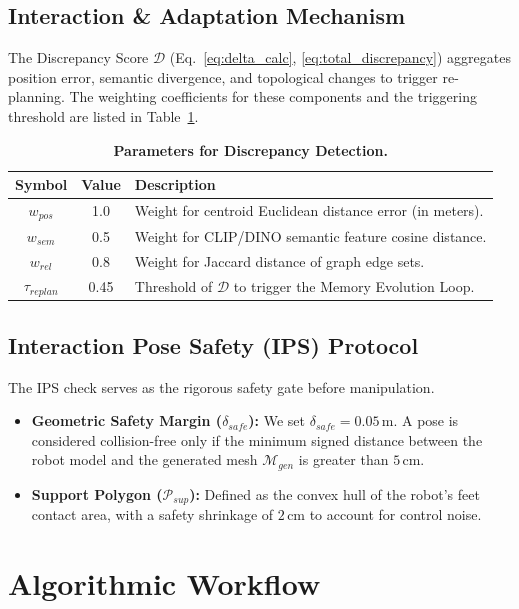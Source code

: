 \documentclass[conference]{IEEEtran}
\begin{document}
\subsection{Interaction \& Adaptation Mechanism}
The Discrepancy Score $\mathcal{D}$ (Eq.~\ref{eq:delta_calc}, \ref{eq:total_discrepancy}) aggregates position error, semantic divergence, and topological changes to trigger re-planning. The weighting coefficients for these components and the triggering threshold are listed in Table~\ref{tab:params_discrepancy}.

\begin{table}[h]
\centering
\caption{\textbf{Parameters for Discrepancy Detection.}}
\label{tab:params_discrepancy}
\begin{tabular}{@{}ccl@{}}
\toprule
\textbf{Symbol} & \textbf{Value} & \textbf{Description} \\ \midrule
$w_{pos}$ & 1.0 & Weight for centroid Euclidean distance error (in meters). \\
$w_{sem}$ & 0.5 & Weight for CLIP/DINO semantic feature cosine distance. \\
$w_{rel}$ & 0.8 & Weight for Jaccard distance of graph edge sets. \\
$\tau_{replan}$ & 0.45 & Threshold of $\mathcal{D}$ to trigger the Memory Evolution Loop. \\ \bottomrule
\end{tabular}
\end{table}

\subsection{Interaction Pose Safety (IPS) Protocol}
The IPS check serves as the rigorous safety gate before manipulation.
\begin{itemize}
    \item \textbf{Geometric Safety Margin ($\delta_{safe}$):} We set $\delta_{safe} = 0.05\,\text{m}$. A pose is considered collision-free only if the minimum signed distance between the robot model and the generated mesh $\mathcal{M}_{gen}$ is greater than $5\,\text{cm}$.
    \item \textbf{Support Polygon ($\mathcal{P}_{sup}$):} Defined as the convex hull of the robot's feet contact area, with a safety shrinkage of $2\,\text{cm}$ to account for control noise.
\end{itemize}

\section{Algorithmic Workflow}
\label{sec:algo_workflow}
\end{document}
